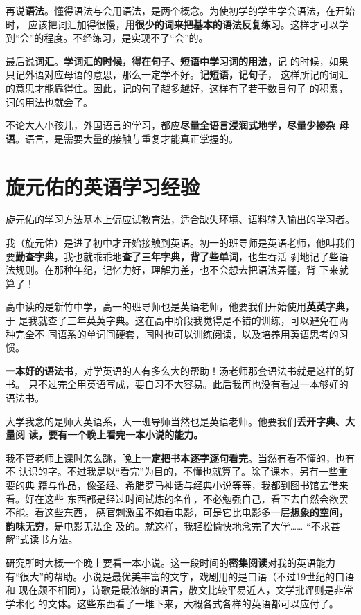 再说\textbf{语法}。懂得语法与会用语法，是两个概念。为使初学的学生学会语法，在开始时，
应该把词汇加得很慢，\textbf{用很少的词来把基本的语法反复练习}。这样才可以学
到“会”的程度。不经练习，是实现不了“会”的。

最后说\textbf{词汇}。\textbf{学词汇的时候，得在句子、短语中学习词的用法，}记
的时候，如果只记外语对应母语的意思，那么一定学不好。\textbf{记短语，记句子}，
这样所记的词汇的意思才能靠得住。因此，记的句子越多越好，这样有了若干数目句子
的积累，词的用法也就会了。

不论大人小孩儿，外国语言的学习，都应\textbf{尽量全语言浸润式地学，尽量少掺杂
  母语}。语言，是需要大量的接触与重复才能真正掌握的。

\section{旋元佑的英语学习经验}

旋元佑的学习方法基本上偏应试教育法，适合缺失环境、语料输入输出的学习者。

我（旋元佑）是进了初中才开始接触到英语。初一的班导师是英语老师，他叫我们
要\textbf{勤查字典}，我也就乖乖地\textbf{查了三年字典，背了些单词}，也生吞活
剥地记了些语法规则。在那种年纪，记忆力好，理解力差，也不会想去把语法弄懂，背
下来就算了！

高中读的是新竹中学，高一的班导师也是英语老师，他要我们开始使用\textbf{英英字典}，于
是我就查了三年英英字典。这在高中阶段我觉得是不错的训练，可以避免在两种完全不
同语系的单词间硬套，同时也可以训练阅读，以及培养用英语思考的习惯。

\textbf{一本好的语法书}，对学英语的人有多么大的帮助！汤老师那套语法书就是这样的好书。
只不过完全用英语写成，要自习不大容易。此后我再也没有看过一本够好的语法书。

大学我念的是师大英语系，大一班导师当然也是英语老师。他要我们\textbf{丢开字典、大量阅
  读，要有一个晚上看完一本小说的能力。}

我不管老师上课时怎么跳，晚上\textbf{一定把书本逐字逐句看完}。当然有看不懂的，也有不
认识的字。不过我是以“看完”为目的，不懂也就算了。除了课本，另有一些重要的典
籍与作品，像圣经、希腊罗马神话与经典小说等等，我都到图书馆去借来看。好在这些
东西都是经过时间试炼的名作，不必勉强自己，看下去自然会欲罢不能。看这些东西，
感官刺激虽不如看电影，可是它比电影多一层\textbf{想象的空间，韵味无穷}，是电影无法企
及的。就这样，我轻松愉快地念完了大学…… “不求甚解”式读书方法。


研究所时大概一个晚上要看一本小说。这一段时间的\textbf{密集阅读}对我的英语能力
有“很大”的帮助。小说是最优美丰富的文字，戏剧用的是口语（不过19世纪的口语和
现在颇不相同），诗歌是最浓缩的语言，散文比较平易近人，文学批评则是非常学术化
的文体。这些东西看了一堆下来，大概各式各样的英语都可以应付了。

